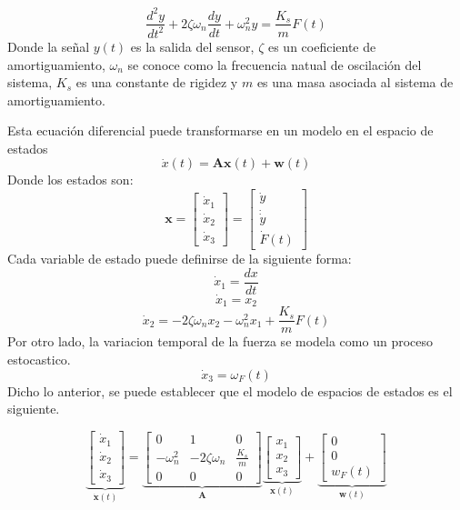 \documentclass[conference]{IEEEtran}
\begin{document}
\begin{equation}
	\frac{d^2y}{dt^2} + 2\zeta\omega_n \frac{dy}{dt} + \omega_n^2 y = \frac{K_s}{m} F(t)
\end{equation}
Donde la se\~nal $y(t)$ es la salida del sensor, $\zeta$ es un coeficiente de amortiguamiento, $\omega_n$ se conoce como la frecuencia natual de oscilaci\'on del sistema, ${K_s}$ es una constante de rigidez y $m$ es una masa asociada al sistema de amortiguamiento.

Esta ecuaci\'on diferencial puede transformarse en un modelo en el espacio de estados
\[
\dot{x}(t) = \mathbf{A}\mathbf{x}(t) + \mathbf{w}(t)
\]
Donde los estados son:
\[
	\mathbf{x} = 
	\begin{bmatrix}
	\dot{x}_1 \\
	\dot{x}_2 \\
	\dot{x}_3
	\end{bmatrix} =
	\begin{bmatrix}
		\dot{y} \\
		\dot\dot{y} \\
		\dot{F}(t)
	\end{bmatrix}
\]
Cada variable de estado puede definirse de la siguiente forma:
\[
	\dot{x}_1 = \frac{ dx}{dt}
\]
\[
	\dot{x}_1 = x_2
\]
\[
	\dot{x}_2 = -2\zeta\omega_n x_2 - \omega_n^2x_1 + \frac{K_s}{m}F(t)
\]
Por otro lado, la variacion temporal de la fuerza se modela como un proceso estocastico.
\[
	\dot{x}_3 =  \omega_{F}(t)
\]
Dicho lo anterior, se puede establecer que el modelo de espacios de estados es el siguiente.


\begin{equation*}
	\underbrace{
		\begin{bmatrix}
			\dot{x}_1 \\
			\dot{x}_2 \\
			\dot{x}_3
		\end{bmatrix}
	}_{\mathbf{\dot{x}}(t)}
	=
	\underbrace{\begin{bmatrix}
			0           & 1                & 0 \\
			-\omega_n^2 & -2\zeta\omega_n  &  \frac{K_s}{m} \\
			0			& 0				   & 0
	\end{bmatrix}}_{\mathbf{A}}
	\underbrace{\begin{bmatrix}
			x_1 \\
			x_2 \\
			x_3
	\end{bmatrix}}_{\mathbf{x}(t)}	
	+
	\underbrace{
	\begin{bmatrix}
		0 \\
		0 \\
		w_{F}(t)
	\end{bmatrix}
	}_{\mathbf{w}(t)}	
\end{equation*}
\end{document}
